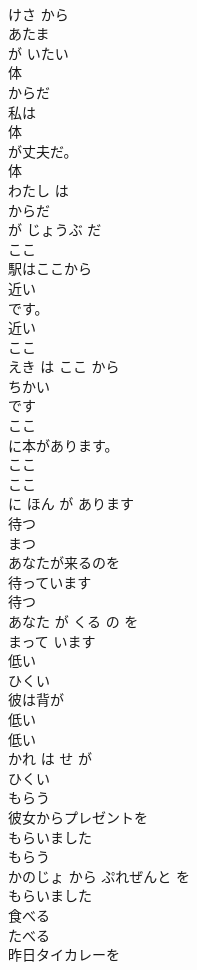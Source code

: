 \documentclass[8pt]{extreport}
\begin{document}
\begin{CJK}{UTF8}{min}
\\	けさ から 
\\	あたま
\\	が いたい	
\\	体	
\\	からだ	
\\	私は
\\	体
\\	が丈夫だ。	
\\	体 
\\	わたし は 
\\	からだ
\\	が じょうぶ だ	
\\	ここ	
\\	駅はここから
\\	近い
\\	です。	
\\	近い 
\\	ここ 
\\	えき は ここ から 
\\	ちかい
\\	です	
\\	ここ
\\	に本があります。	
\\	ここ 
\\	ここ
\\	に ほん が あります	
\\	待つ	
\\	まつ	
\\	あなたが来るのを
\\	待っています
\\	待つ 
\\	あなた が くる の を 
\\	まって います
\\	低い	
\\	ひくい	
\\	彼は背が
\\	低い
\\	低い 
\\	かれ は せ が 
\\	ひくい
\\	もらう	
\\	彼女からプレゼントを
\\	もらいました
\\	もらう 
\\	かのじょ から ぷれぜんと を 
\\	もらいました
\\	食べる	
\\	たべる	
\\	昨日タイカレーを

\end{CJK}
\end{document}
